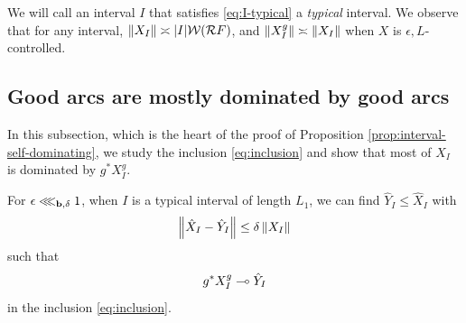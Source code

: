 We will call an interval $I$ that satisfies \eqref{eq:I-typical} a \emph{typical} interval.
We observe that for any interval, $\left\Vert X_I \right\Vert \asymp |I| \mathcal W(\mathcal R F)$, and $\left\Vert X^g_I \right\Vert \asymp \left\Vert X_I \right\Vert$ when $X$ is $\epsilon, L$-controlled.

\subsection{Good arcs are mostly dominated by good arcs} \label{align:good-by-good}
In this subsection,
which is the heart of the proof of Proposition \ref{prop:interval-self-dominating},
 we study the inclusion \eqref{eq:inclusion} and show that most of $X_I$ is dominated by $g^*X^g_I$. 
\begin{prop} \label{prop:most-well-dominated}
For $\epsilon \lll_{\mathbf b, \delta} 1$,
when $I$ is a typical interval of length $L_1$,
we can find $\hat Y_I \le \hat X_I$ with 
\begin{equation} \label{eq:most-well-dominated}
\left\Vert \hat X_I - \hat Y_I \right\Vert \le \delta\left\Vert X_I \right\Vert
\end{equation}
such that 
\begin{equation} \label{eq:most-well-dominated-dominated}
g^*X^g_I \multimap \hat Y_I
\end{equation}
in the inclusion \eqref{eq:inclusion}.
\end{prop}
